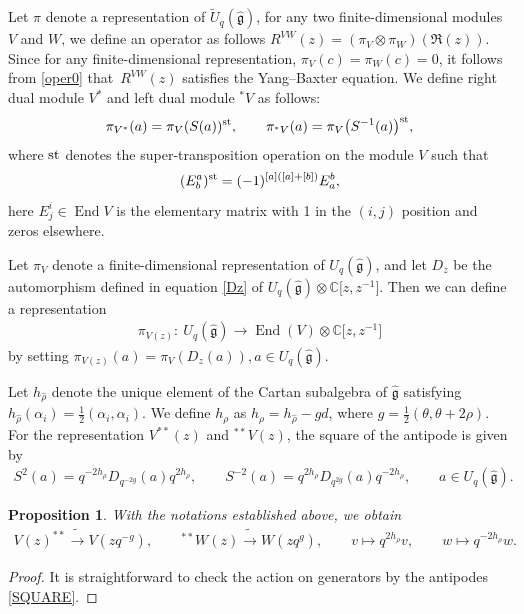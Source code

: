 \documentclass[pdftex]{sigma}
\numberwithin{equation}{section}
\newtheorem{Proposition}[Theorem]{Proposition}
 { \theoremstyle{definition}
\newtheorem{Definition}[Theorem]{Definition}
\newtheorem{Note}[Theorem]{Note}
\newtheorem{Example}[Theorem]{Example}
\newtheorem{Remark}[Theorem]{Remark} }
\begin{document}
Let $\pi$ denote a representation of $\widetilde{U}_q(\mathfrak{\hat{g}})$, for any two finite-dimensional modules $V$ and $W$, we define an operator as follows
$
R^{VW}(z)=(\pi_V\otimes\pi_W)(\mathfrak{R}(z))$.
Since for any finite-dimensional representation, $\pi_V(c)=\pi_W(c)=0$, it follows from \eqref{oper0} that~$R^{VW}(z)$ satisfies the Yang--Baxter equation.
We define right dual module $V^\ast$ and left dual module $^\ast V$ as follows:
\begin{gather*}
 \pi_{V^\ast}(a)=\pi_V(S(a))^{\rm st},\qquad \pi_{^\ast V}(a)=\pi_V\bigl(S^{-1}(a)\bigr)^{\rm st},
\end{gather*}
where ${\rm st}$ denotes the super-transposition operation on the module $V$ such that
\[(E^{a}_b)^{\rm st}=(-1)^{[a]([a]+[b])}E^{b}_a,
\]
here $E^{i}_j\in \operatorname{End}V$ is the elementary matrix with 1 in the $(i,j)$ position and zeros elsewhere.



Let $\pi_V$ denote a finite-dimensional representation of $U_q(\mathfrak{\hat{g}})$, and let $D_z$ be the automorphism defined in equation \eqref{Dz} of $U_q(\mathfrak{\hat{g}})\otimes\mathbb{C}\bigl[z, z^{-1}\bigr]$. Then we can define a representation
\begin{gather*}
 \pi_{V(z)}\colon\ U_q(\mathfrak{\hat{g}})\rightarrow \operatorname{End}(V)\otimes\mathbb{C}\bigl[z, z^{-1}\bigr]
\end{gather*}
by setting $\pi_{V(z)}(a)=\pi_{V}(D_z(a)), a\in U_q(\mathfrak{\hat{g}})$.


Let $h_{\hat{\rho}}$ denote the unique element of the Cartan subalgebra of $\mathfrak{\hat{g}}$ satisfying $h_{\hat{\rho}}(\alpha_i)=\frac{1}{2}(\alpha_i, \alpha_i)$. We define $h_\rho$ as
$
 h_\rho=h_{\hat{\rho}}-gd$,
where $g=\frac{1}{2}(\theta, \theta+2\rho)$.
For the representation $V^{\ast\ast}(z)$ and $^{\ast\ast}V(z)$, the square of the antipode is given by
\begin{gather}\label{SQUARE}
 S^2(a)=q^{-2h_{\rho}}D_{q^{-2g}}(a)q^{2h_{\rho}}, \qquad S^{-2}(a)=q^{2h_{\rho}}D_{q^{2g}}(a)q^{-2h_{\rho}},\qquad a\in U_q(\mathfrak{\hat{g}}).
\end{gather}

\begin{Proposition} With the notations established above, we obtain
 \begin{gather*}
 V(z)^{\ast\ast}\tilde{\rightarrow}V(zq^{-g}), \qquad ^{\ast\ast}W(z)\tilde{\rightarrow}W(zq^{g}), \qquad v\mapsto q^{2h_\rho}v, \qquad w\mapsto q^{-2h_\rho}w.
 \end{gather*}
\end{Proposition}
\begin{proof}
It is straightforward to check the action on generators by the antipodes \eqref{SQUARE}.
\end{proof}
\end{document}
